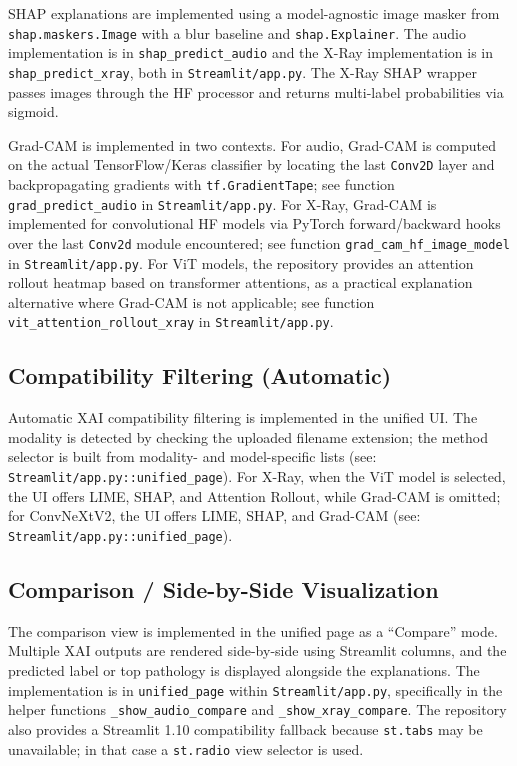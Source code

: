 \documentclass[11pt,a4paper]{article}
\begin{document}
SHAP explanations are implemented using a model-agnostic image masker from \texttt{shap.maskers.Image} with a blur baseline and \texttt{shap.Explainer}. The audio implementation is in \texttt{shap\_predict\_audio} and the X-Ray implementation is in \texttt{shap\_predict\_xray}, both in \texttt{Streamlit/app.py}. The X-Ray SHAP wrapper passes images through the HF processor and returns multi-label probabilities via sigmoid.

Grad-CAM is implemented in two contexts. For audio, Grad-CAM is computed on the actual TensorFlow/Keras classifier by locating the last \texttt{Conv2D} layer and backpropagating gradients with \texttt{tf.GradientTape}; see function \texttt{grad\_predict\_audio} in \texttt{Streamlit/app.py}. For X-Ray, Grad-CAM is implemented for convolutional HF models via PyTorch forward/backward hooks over the last \texttt{Conv2d} module encountered; see function \texttt{grad\_cam\_hf\_image\_model} in \texttt{Streamlit/app.py}. For ViT models, the repository provides an attention rollout heatmap based on transformer attentions, as a practical explanation alternative where Grad-CAM is not applicable; see function \texttt{vit\_attention\_rollout\_xray} in \texttt{Streamlit/app.py}.

\subsection{Compatibility Filtering (Automatic)}
Automatic XAI compatibility filtering is implemented in the unified UI. The modality is detected by checking the uploaded filename extension; the method selector is built from modality- and model-specific lists (see: \texttt{Streamlit/app.py::unified\_page}). For X-Ray, when the ViT model is selected, the UI offers LIME, SHAP, and Attention Rollout, while Grad-CAM is omitted; for ConvNeXtV2, the UI offers LIME, SHAP, and Grad-CAM (see: \texttt{Streamlit/app.py::unified\_page}).

\subsection{Comparison / Side-by-Side Visualization}
The comparison view is implemented in the unified page as a ``Compare'' mode. Multiple XAI outputs are rendered side-by-side using Streamlit columns, and the predicted label or top pathology is displayed alongside the explanations. The implementation is in \texttt{unified\_page} within \texttt{Streamlit/app.py}, specifically in the helper functions \texttt{\_show\_audio\_compare} and \texttt{\_show\_xray\_compare}. The repository also provides a Streamlit 1.10 compatibility fallback because \texttt{st.tabs} may be unavailable; in that case a \texttt{st.radio} view selector is used.
\end{document}
